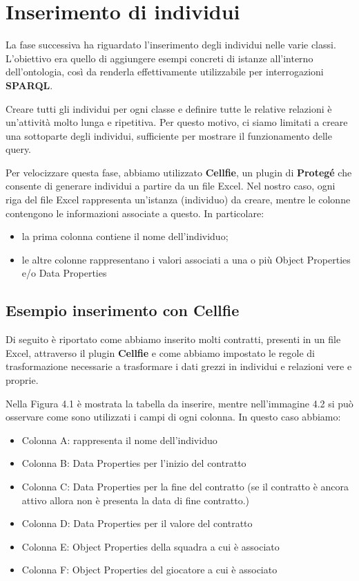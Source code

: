 \documentclass[11pt]{report} %
\begin{document}
\chapter{Inserimento di individui}
La fase successiva ha riguardato l'inserimento degli individui nelle varie classi. L'obiettivo era quello di aggiungere esempi concreti di istanze all'interno dell'ontologia, così da renderla effettivamente utilizzabile per interrogazioni \textbf{SPARQL}.

\hfill

Creare tutti gli individui per ogni classe e definire tutte le relative relazioni è un'attività molto lunga e ripetitiva. Per questo motivo, ci siamo limitati a creare una sottoparte degli individui, sufficiente per mostrare il funzionamento delle query.

\hfill

Per velocizzare questa fase, abbiamo utilizzato \textbf{Cellfie}, un plugin di \textbf{Protegé} che consente di generare individui a partire da un file Excel.
Nel nostro caso, ogni riga del file Excel rappresenta un'istanza (individuo) da creare, mentre le colonne contengono le informazioni associate a questo. In particolare:

\begin{itemize}
    \item la prima colonna contiene il nome dell'individuo;
    \item le altre colonne rappresentano i valori associati a una o più Object Properties e/o Data Properties
\end{itemize}
\newpage
\section{Esempio inserimento con Cellfie}
Di seguito è riportato come abbiamo inserito molti contratti, presenti in un file Excel, attraverso il plugin \textbf{Cellfie} e come abbiamo impostato le regole di trasformazione necessarie a trasformare i dati grezzi in individui e relazioni vere e proprie.

\hfill

Nella Figura 4.1 è mostrata la tabella da inserire, mentre nell'immagine 4.2 si può osservare come sono utilizzati i campi di ogni colonna.
In questo caso abbiamo:
\begin{itemize}
    \item Colonna A: rappresenta il nome dell'individuo
    \item Colonna B: Data Properties per l'inizio del contratto
    \item Colonna C: Data Properties per la fine del contratto (se il contratto è ancora attivo allora non è presenta la data di fine contratto.)
    \item Colonna D: Data Properties per il valore del contratto
    \item Colonna E: Object Properties della squadra a cui è associato
    \item Colonna F: Object Properties del giocatore a cui è associato
\end{itemize}
\end{document}
